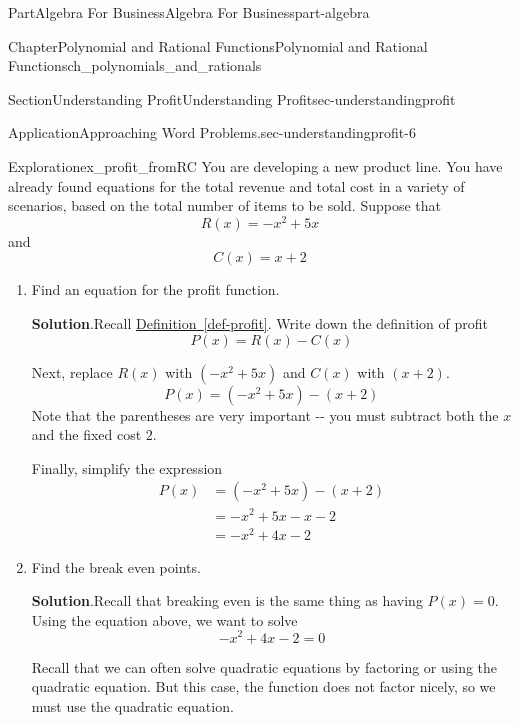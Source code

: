 \documentclass[oneside,10pt,]{tufte-book}
\newcommand{\blocktitlefont}{\relax}
\newcommand{\xreffont}{\relax}
\numberwithin{equation}{chapter}
\newcommand{\amp}{&}
\begin{document}
\begin{partptx}{Part}{Algebra For Business}{}{Algebra For Business}{}{}{part-algebra}
\begin{chapterptx}{Chapter}{Polynomial and Rational Functions}{}{Polynomial and Rational Functions}{}{}{ch_polynomials_and_rationals}
\begin{sectionptx}{Section}{Understanding Profit}{}{Understanding Profit}{}{}{sec-understandingprofit}
\begin{insight}{Application}{Approaching Word Problems.}{sec-understandingprofit-6}
\begin{itemize}[label=\textbullet]
\end{itemize}
%
\end{insight}
\begin{exploration}{Exploration}{}{ex_profit_fromRC}%
You are developing a new product line. You have already found equations for the total revenue and total cost in a variety of scenarios, based on the total number of items to be sold.  Suppose that%
\begin{equation*}
R(x) = -x^2 + 5x
\end{equation*}
and%
\begin{equation*}
C(x) = x+2
\end{equation*}
%
\begin{enumerate}[font=\bfseries,label=(\alph*),ref=\alph*]%
\item{}Find an equation for the profit function.%
\par\smallskip%
\noindent\textbf{\blocktitlefont Solution}.\hypertarget{ex_profit_fromRC-2-2}{}\quad{}Recall \hyperref[def-profit]{Definition~{\xreffont\ref{def-profit}}}.  Write down the definition of profit%
\begin{equation*}
P(x) = R(x) - C(x)
\end{equation*}
%
\par
Next, replace \(R(x)\) with \((-x^2 + 5x)\) and \(C(x)\) with \((x+2)\).%
\begin{equation*}
P(x) = (-x^2 + 5x) - (x+2)
\end{equation*}
Note that the parentheses are very important -{}-{} you must subtract both the \(x\) and the fixed cost \(2\).%
\par
Finally, simplify the expression%
\begin{align*}
P(x) \amp =  (-x^2 + 5x) - (x+2)\\
\amp = -x^2 + 5x -x -2\\
\amp = -x^2 + 4x -2
\end{align*}
%
\item{}Find the break even points.%
\par\smallskip%
\noindent\textbf{\blocktitlefont Solution}.\hypertarget{ex_profit_fromRC-3-2}{}\quad{}Recall that breaking even is the same thing as having \(P(x) = 0\).  Using the equation above, we want to solve%
\begin{equation*}
-x^2 + 4x -2 = 0
\end{equation*}
%
\par
Recall that we can often solve quadratic equations by factoring or using the quadratic equation.  But this case, the function does not factor nicely, so we must use the quadratic equation.%

\end{enumerate}
\end{exploration}
\end{sectionptx}
\end{chapterptx}
\end{partptx}
\end{document}
